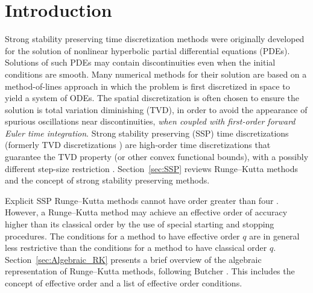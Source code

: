 \section{Introduction}\label{sec:Intro}
Strong stability preserving time discretization methods were originally
developed for the solution of nonlinear hyperbolic 
partial differential equations (PDEs).  Solutions of such PDEs may 
contain discontinuities even when the initial conditions are smooth.
Many numerical methods for their solution are based on a method-of-lines approach 
in which the problem is first discretized in space to yield a system of ODEs. 
The spatial discretization is often chosen to ensure the solution is total variation diminishing (TVD),
in order to avoid the appearance of spurious oscillations near discontinuities,
\emph{when coupled with first-order forward Euler time integration}.
Strong stability preserving (SSP) time discretizations (formerly TVD
discretizations \cite{Gottlieb/Shu:1998}) are high-order time
discretizations that guarantee the TVD property (or other convex functional bounds), with a
possibly different step-size restriction \cite{Gottlieb2011a}.
Section~\ref{sec:SSP} reviews Runge--Kutta methods and the concept of
strong stability preserving methods.

Explicit SSP Runge--Kutta methods cannot have order greater
than four \cite{Ruuth2002}.  However, a Runge--Kutta method may 
achieve an effective order of accuracy higher than its classical order 
by the use of special starting and stopping procedures.
The conditions for a method to have effective order $q$ are 
in general less restrictive than the conditions for a method
to have classical order $q$.
Section~\ref{sec:Algebraic_RK} presents a brief overview of the
algebraic representation of Runge--Kutta methods, following Butcher
\cite{Butcher2008_book}.
This includes the concept of effective order and a list of effective
order conditions.

